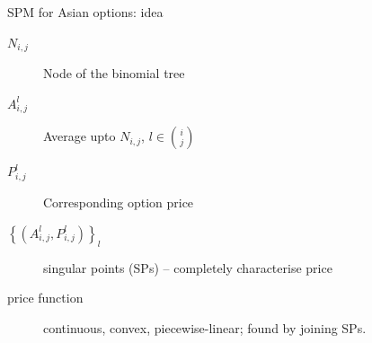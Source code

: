 \documentclass[utf8,t,xcolor=svgnames]{beamer}
\begin{document}
\begin{frame}{SPM for Asian options: idea}
	\begin{description}
		\item[$ N_{i,j} $] Node of the binomial tree
		\item[$ A_{i,j}^l $] Average upto $ N_{i,j} $, $ l \in \binom{i}{j} $
		\item[$ P_{i,j}^l $] Corresponding option price
		\item[$ \left\lbrace \left( A_{i,j}^l, P_{i,j}^l \right) \right\rbrace_l $] \alert{singular points} (SPs) -- \alert{completely characterise price}
		\item[price function] continuous, convex, piecewise-linear; found by joining SPs.
	\end{description}
\end{frame}
\end{document}
